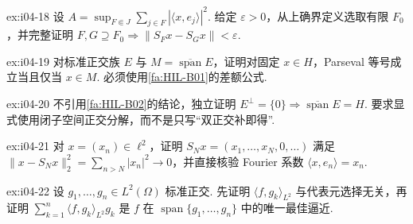 \begin{FAExercise}[Fourier有限子集网的Cauchy性]{ex:i04-18}
设 \(\displaystyle A=\sup_{F\Subset J}\sum_{j\in F}|\langle x,e_j\rangle|^2\). 给定 \(\displaystyle \varepsilon>0\)，从上确界定义选取有限 \(\displaystyle F_0\)，并完整证明 \(\displaystyle F,G\supseteq F_0\Rightarrow\|S_Fx-S_Gx\|<\varepsilon\).
\end{FAExercise}

\begin{FAExercise}[Parseval与闭线性张成]{ex:i04-19}
对标准正交族 \(\displaystyle E\) 与 \(\displaystyle M=\overline{\operatorname{span}}E\)，证明对固定 \(\displaystyle x\in H\)，Parseval 等号成立当且仅当 \(\displaystyle x\in M\). 必须使用\autoref{fa:HIL-B01}的差额公式.
\end{FAExercise}

\begin{FAExercise}[正交基完备性判据]{ex:i04-20}
不引用\autoref{fa:HIL-B02}的结论，独立证明 \(\displaystyle E^\perp=\{0\}\Rightarrow\overline{\operatorname{span}}E=H\). 要求显式使用闭子空间正交分解，而不是只写“双正交补即得”.
\end{FAExercise}

\begin{FAExercise}{ex:i04-21}
对 \(\displaystyle x=(x_n)\in\ell^2\)，证明 \(\displaystyle S_Nx=(x_1,\dots,x_N,0,\dots)\) 满足 \(\displaystyle \|x-S_Nx\|_2^2=\sum_{n>N}|x_n|^2\to0\)，并直接核验 Fourier 系数 \(\displaystyle \langle x,e_n\rangle=x_n\).
\end{FAExercise}

\begin{FAExercise}{ex:i04-22}
设 \(\displaystyle g_1,\dots,g_n\in L^2(\Omega)\) 标准正交. 先证明 \(\displaystyle \langle f,g_k\rangle_{L^2}\) 与代表元选择无关，再证明 \(\displaystyle \sum_{k=1}^{n}\langle f,g_k\rangle_{L^2}g_k\) 是 \(\displaystyle f\) 在 \(\displaystyle \operatorname{span}\{g_1,\dots,g_n\}\) 中的唯一最佳逼近.
\end{FAExercise}
